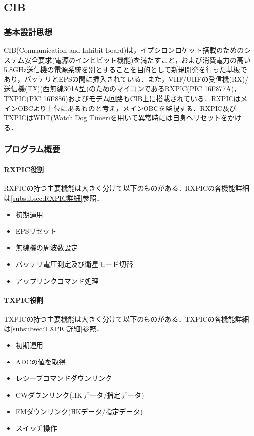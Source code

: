 
\subsection{CIB}
\subsubsection{基本設計思想}
CIB(Communication and Inhibit Board)は，イプシロンロケット搭載のためのシステム安全要求(電源のインヒビット機能)を満たすこと，および消費電力の高い5.8GHz送信機の電源系統を別とすることを目的として新規開発を行った基板であり，バッテリとEPSの間に挿入されている．また，VHF/UHFの受信機(RX)/送信機(TX)(西無線301A型)のためのマイコンであるRXPIC(PIC 16F877A)，TXPIC(PIC 16F886)およびモデム回路もCIB上に搭載されている．RXPICはメインOBCより上位にあるものと考え，メインOBCを監視する．RXPIC及びTXPICはWDT(Watch Dog Timer)を用いて異常時には自身へリセットをかける．

\subsubsection{プログラム概要}
\paragraph{RXPIC役割}\label{par:RXPIC役割}
RXPICの持つ主要機能は大きく分けて以下のものがある．RXPICの各機能詳細は\ref{subsubsec:RXPIC詳細}参照．
\begin{itemize}
	\item 初期運用
	\item EPSリセット
	\item 無線機の周波数設定
	\item バッテリ電圧測定及び衛星モード切替
	\item アップリンクコマンド処理
\end{itemize}

\paragraph{TXPIC役割}\label{par:TXPIC役割}
TXPICの持つ主要機能は大きく分けて以下のものがある．TXPICの各機能詳細は\ref{subsubsec:TXPIC詳細}参照．
\begin{itemize}
	\item 初期運用
	\item ADCの値を取得
	\item レシーブコマンドダウンリンク
	\item CWダウンリンク(HKデータ/指定データ)
	\item FMダウンリンク(HKデータ/指定データ)
	\item スイッチ操作
\end{itemize}


